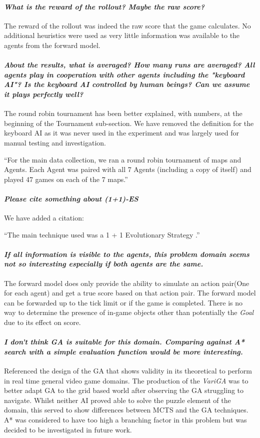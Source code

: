 \documentclass{article}
\begin{document}
\paragraph*{\textit{What is the reward of the rollout? Maybe the raw score?}}
The reward of the rollout was indeed the raw score that the game calculates. No additional heuristics were used as very little information was available to the agents from the forward model.
\paragraph*{\textit{About the results, what is averaged? How many runs are averaged? All agents play in cooperation with other agents including the "keyboard AI"? Is the keyboard AI controlled by human beings? Can we assume it plays perfectly well?}}
The round robin tournament has been better explained, with numbers, at the beginning of the Tournament sub-section.
We have removed the definition for the keyboard AI as it was never used in the experiment and was largely used for manual testing and investigation.

``For the main data collection, we ran a round robin tournament of maps and Agents. Each Agent was paired with all 7 Agents (including a copy of itself) and played 47 games on each of the 7 maps.''
\paragraph*{\textit{Please cite something about (1+1)-ES}}
We have added a citation:

``The main technique used was a 1 + 1 Evolutionary Strategy \cite{t.back2000evolutionary-co}.''

\paragraph*{\textit{If all information is visible to the agents,
this problem domain seems not so interesting especially if
both agents are the same.}}
The forward model does only provide the ability to simulate an action pair(One for each agent) and get a true score based on that action pair. The forward model can be forwarded up to the tick limit or if the game is completed. There is no way to determine the presence of in-game objects other than potentially the \emph{Goal} due to its effect on score.
\paragraph*{\textit{I don't think GA is suitable for this domain.
Comparing against A* search with a simple evaluation function would be more interesting.}}
Referenced the design of the GA that shows validity in its theoretical to perform in real time general video game domains. The production of the \emph{VariGA} was to better adapt GA to the grid based world after observing the GA struggling to navigate. Whilst neither AI proved able to solve the puzzle element of the domain, this served to show differences between MCTS and the GA techniques. A* was considered to have too high a branching factor in this problem but was decided to be investigated in future work.
\end{document}
